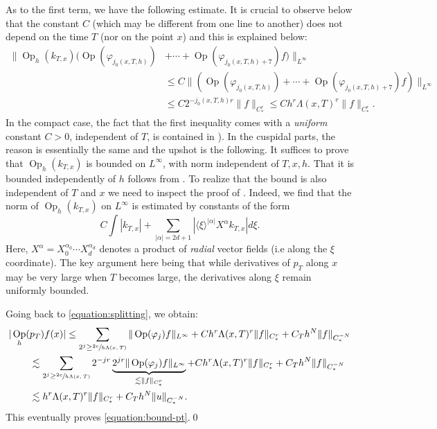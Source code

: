 \documentclass[JEP,XML,SOM,Unicode,NoFloatCountersInSection]{cedram}
\DeclareMathOperator{\Op}{Op}
\theoremstyle{plain}
\theoremstyle{definition}
\begin{document}
As to the first term, we have the following estimate. It is crucial to observe below that the constant $C$ (which may be different from one line to another) does not depend on the time $T$ (nor on the point $x$) and this is explained below:
\[
\begin{split}
\|\Op_h(k_{T,x})\bigl( \Op(\varphi_{j_0(x,T,h)}) &+ \cdots + \Op(\varphi_{j_0(x,T,h)+7}) f \bigr)\|_{L^\infty} \\
&\leq C \|\left( \Op(\varphi_{j_0(x,T,h)}) + \cdots + \Op(\varphi_{j_0(x,T,h)+7}) f \right)\|_{L^\infty} \\
&\leq C 2^{-j_0(x,T,h)r} \|f\|_{C^r_*} \leq C h^{r} \Lambda(x,T)^r \|f\|_{C^r_*}.
\end{split}
\]
In the compact case, the fact that the first inequality comes with a \emph{uniform} constant $C > 0$, independent of $T$, is contained in \cite[Proof of Lem.\,3.3]{Bonthonneau-Lefeuvre-21}). In the cuspidal parts, the reason is essentially the same and the upshot is the following. It suffices to prove that $\Op_h(k_{T,x})$ is bounded on $L^\infty$, with norm independent of $T, x, h$. That it is bounded independently of $h$ follows from \cite[Lem.\,3.2]{Bonthonneau-Lefeuvre-19-1}. To realize that the bound is also independent of $T$ and $x$ we need to inspect the proof of \cite[Lem.\,3.2]{Bonthonneau-Lefeuvre-19-1}. Indeed, we find that the norm of $\Op_h(k_{T,x})$ on $L^\infty$ is estimated by constants of the form
\[
C \int |k_{T,x}| + \sum_{|\alpha|=2d+1}|\langle\xi\rangle^{|\alpha|} X^\alpha k_{T,x}| d\xi.
\]
Here, $X^\alpha=X^{\alpha_0}_0 \cdots X^{\alpha_d}_d$ denotes a product of \emph{radial} vector fields (i.e along the $\xi$ coordinate). The key argument here being that while derivatives of $p_T$ along $x$ may be very large when $T$ becomes large, the derivatives along $\xi$ remain uniformly bounded.

Going back to \eqref{equation:splitting}, we obtain:
\[
\begin{split}
|\Op_h( &p_T )f (x)|  \leq \sum_{2^{j}\geq \sfrac{2c}{h \Lambda(x,T)}} \|\Op(\varphi_j)f\|_{L^\infty} + C h^{r} \Lambda(x,T)^r \|f\|_{C^r_*} + C_T h^N \|f\|_{C^{-N}_*} \\
&\lesssim \sum_{2^{j}\geq \sfrac{2c}{h \Lambda(x,T)}} 2^{-jr} \underbrace{2^{jr} \|\Op(\varphi_j)f\|_{L^\infty}}_{\lesssim \|f\|_{C^r_*}} + C h^{r} \Lambda(x,T)^r \|f\|_{C^r_*} + C_T h^N \|f\|_{C^{-N}_*} \\
&\lesssim h^r \Lambda(x,T)^r \|f\|_{C^r_*} + C_T h^N \|u\|_{C^{-N}_*}.
\end{split}
\]
This eventually proves \eqref{equation:bound-pt}.\qed
\end{document}
